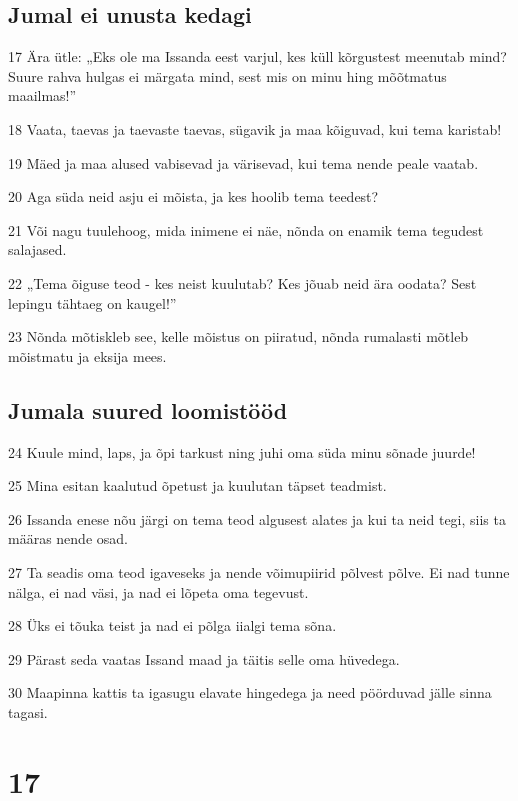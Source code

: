 \section*{Jumal ei unusta kedagi}

\par 17 Ära ütle: „Eks ole ma Issanda eest varjul, kes küll kõrgustest meenutab mind? Suure rahva hulgas ei märgata mind, sest mis on minu hing mõõtmatus maailmas!”
\par 18 Vaata, taevas ja taevaste taevas, sügavik ja maa kõiguvad, kui tema karistab!
\par 19 Mäed ja maa alused vabisevad ja värisevad, kui tema nende peale vaatab.
\par 20 Aga süda neid asju ei mõista, ja kes hoolib tema teedest?
\par 21 Või nagu tuulehoog, mida inimene ei näe, nõnda on enamik tema tegudest salajased.
\par 22 „Tema õiguse teod - kes neist kuulutab? Kes jõuab neid ära oodata? Sest lepingu tähtaeg on kaugel!”
\par 23 Nõnda mõtiskleb see, kelle mõistus on piiratud, nõnda rumalasti mõtleb mõistmatu ja eksija mees.

\section*{Jumala suured loomistööd}

\par 24 Kuule mind, laps, ja õpi tarkust ning juhi oma süda minu sõnade juurde!
\par 25 Mina esitan kaalutud õpetust ja kuulutan täpset teadmist.
\par 26 Issanda enese nõu järgi on tema teod algusest alates ja kui ta neid tegi, siis ta määras nende osad.
\par 27 Ta seadis oma teod igaveseks ja nende võimupiirid põlvest põlve. Ei nad tunne nälga, ei nad väsi, ja nad ei lõpeta oma tegevust.
\par 28 Üks ei tõuka teist ja nad ei põlga iialgi tema sõna.
\par 29 Pärast seda vaatas Issand maad ja täitis selle oma hüvedega.
\par 30 Maapinna kattis ta igasugu elavate hingedega ja need pöörduvad jälle sinna tagasi.

\chapter{17}

